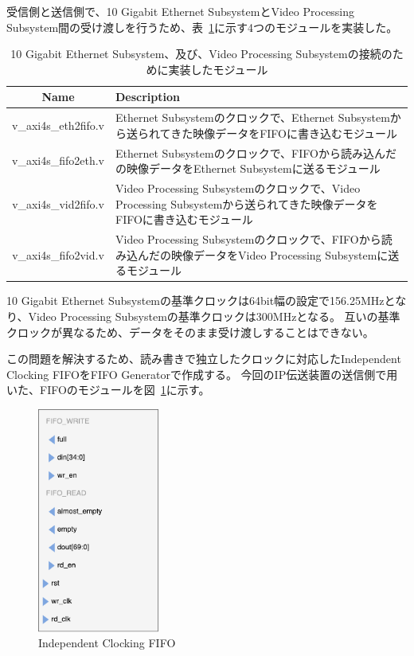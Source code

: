 受信側と送信側で、10 Gigabit Ethernet SubsystemとVideo Processing Subsystem間の受け渡しを行うため、表~\ref{tb:fpga-implement-modules}に示す4つのモジュールを実装した。

\begin{table}[htbp]
  \caption{10 Gigabit Ethernet Subsystem、及び、Video Processing Subsystemの接続のために実装したモジュール}
  \label{tb:fpga-implement-modules}
  \begin{center}
  \begin{tabular}{c|p{12cm}}
    \hline
    Name               & Description \\\hline\hline
    v\_axi4s\_eth2fifo.v & Ethernet Subsystemのクロックで、Ethernet Subsystemから送られてきた映像データをFIFOに書き込むモジュール \\\hline
    v\_axi4s\_fifo2eth.v & Ethernet Subsystemのクロックで、FIFOから読み込んだの映像データをEthernet Subsystemに送るモジュール \\\hline
    v\_axi4s\_vid2fifo.v & Video Processing Subsystemのクロックで、Video Processing Subsystemから送られてきた映像データをFIFOに書き込むモジュール \\\hline
    v\_axi4s\_fifo2vid.v & Video Processing Subsystemのクロックで、FIFOから読み込んだの映像データをVideo Processing Subsystemに送るモジュール \\\hline
  \end{tabular}\end{center}
\end{table}

10 Gigabit Ethernet Subsystemの基準クロックは64bit幅の設定で156.25MHzとなり、Video Processing Subsystemの基準クロックは300MHzとなる。
互いの基準クロックが異なるため、データをそのまま受け渡しすることはできない。

この問題を解決するため、読み書きで独立したクロックに対応したIndependent Clocking FIFOをFIFO Generatorで作成する。
今回のIP伝送装置の送信側で用いた、FIFOのモジュールを図~\ref{fig:fpga-independent-clocking-fifo}に示す。

\begin{figure}[htbp]
  \begin{center}
    \includegraphics[bb=0 0 201 371,width=4cm]{img/fpga-independent-clocking-fifo.pdf}
  \end{center}
  \caption{Independent Clocking FIFO}
  \label{fig:fpga-independent-clocking-fifo}
\end{figure}

